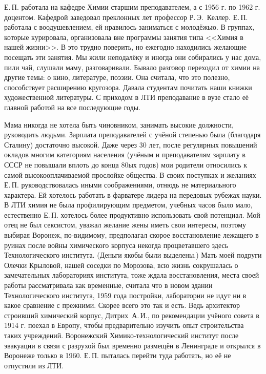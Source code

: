 Е.\,П. работала на кафедре Химии старшим преподавателем, а с 1956 г. по 1962 г. доцентом. Кафедрой заведовал преклонных лет профессор Р.\,Э.~Келлер. Е.\,П. работала с воодушевлением, ей нравилось заниматься с молодёжью. В группах, которые курировала, организовала вне программы занятия типа <<Химия в нашей жизни>>. В это трудно поверить, но ежегодно находились желающие посещать эти занятия. Мы жили неподалёку и иногда они собирались у нас дома, пили чай, слушали маму, разговаривали. Бывало разговор переходил от химии на другие темы: о кино, литературе, поэзии. Она считала, что это полезно, способствует расширению кругозора. Давала студентам почитать наши книжки художественной литературы. С приходом в ЛТИ преподавание в вузе стало её главной работой на все последующие годы.

Мама никогда не хотела быть чиновником, занимать высокие должности, руководить людьми. Зарплата преподавателей с учёной степенью была (благодаря Сталину) достаточно высокой. Даже через 30 лет, после регулярных повышений окладов многим категориям населения (учёным и преподавателям зарплату в СССР не повышали вплоть до конца 80ых годов) мои родители относились к самой высокооплачиваемой прослойке общества. В своих поступках и желаниях Е.\,П. руководствовалась иными соображениями, отнюдь не материального характера. Ей хотелось работать в фарватере лидера на передовых рубежах науки. В ЛТИ химия не была профилирующим предметом, учебных часов было мало, естественно Е.\,П. хотелось более продуктивно использовать свой потенциал. Мой отец не был сексистом, уважал желание жены иметь свои интересы, поэтому выбирая Воронеж, по-видимому, предполагал скорое восстановление лежащего в руинах после войны химического корпуса некогда процветавшего здесь Технологического института.
(Деньги якобы  были выделены.) Мать моей подруги Олечки Крыловой, нашей соседки по  Морозова, всю жизнь сокрушалась о замечательных лабораториях института, тоже ждала восстановления, места своей работы рассматривала как временные, считала что в новом здании Технологического института, 1959 года постройки, лаборатории не идут ни в какое сравнение с прежними. Скорее всего это так и есть. Ведь архитектор строивший химический корпус, Дитрих~А.\,И., по рекомендации учёного совета в 1914 г. поехал в Европу, чтобы предварительно изучить опыт строительства  таких учреждений. Воронежский Химико-технологический институт после эвакуации в связи с разрухой был временно размещён в Ленинграде и открылся  в Воронеже только в 1960. Е.\,П. пыталась перейти туда работать, но её не отпустили из ЛТИ.

